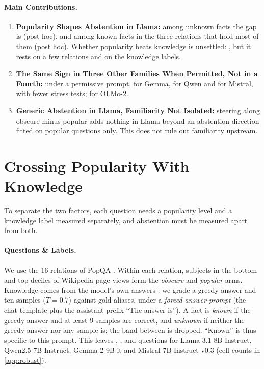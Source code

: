 \documentclass[manuscript,screen,review,anonymous,nonacm]{acmart}
\begin{document}
\paragraph{Main Contributions.}
\begin{enumerate}
\item \textbf{Popularity Shapes Abstention in Llama:} among unknown facts the gap is \rcUnk{} \rcUnkCI{} (post hoc), and among known facts in the three relations that hold most of them \msKnownGap{} \msKnownGapCI{} (post hoc). Whether popularity beats knowledge is unsettled: \hmLlamaDiff{} \hmLlamaDiffCI, but it rests on a few relations and on the knowledge labels.
\item \textbf{The Same Sign in Three Other Families When Permitted, Not in a Fourth:} under a permissive prompt, \pmGemmaDiff{} \pmGemmaDiffCI{} for Gemma, \pmQwenDiff{} \pmQwenDiffCI{} for Qwen and \pmMistralDiff{} \pmMistralDiffCI{} for Mistral, with fewer stress tests; \pmOlmoDiff{} \pmOlmoDiffCI{} for OLMo-2.
\item \textbf{Generic Abstention in Llama, Familiarity Not Isolated:} steering along obscure-minus-popular adds nothing in Llama beyond an abstention direction fitted on popular questions only. This does not rule out familiarity upstream.
\end{enumerate}

\section{Crossing Popularity With Knowledge}
\label{sec:setup}

To separate the two factors, each question needs a popularity level and a knowledge label measured separately, and abstention must be measured apart from both.

\paragraph{Questions \& Labels.} We use the 16 relations of PopQA \cite{mallen2023popqa}. Within each relation, subjects in the bottom and top deciles of Wikipedia page views form the \emph{obscure} and \emph{popular} arms. Knowledge comes from the model's own answers \cite{gekhman2024slick}: we grade a greedy answer and ten samples ($T=0.7$) against gold aliases, under a \emph{forced-answer prompt} (the chat template plus the assistant prefix ``The answer is''). A fact is \emph{known} if the greedy answer and at least 9 samples are correct, and \emph{unknown} if neither the greedy answer nor any sample is; the band between is dropped. ``Known'' is thus specific to this prompt. This leaves \faLlamaN, \faQwenN, \faGemmaN{} and \faMistralN{} questions for Llama-3.1-8B-Instruct, Qwen2.5-7B-Instruct, Gemma-2-9B-it and Mistral-7B-Instruct-v0.3 \cite{llama3,qwen25,gemma2,mistral7b} (cell counts in \cref{app:robust}).
\end{document}
